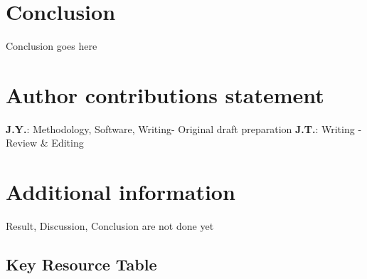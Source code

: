\documentclass[fleqn,10pt]{wlscirep}
\begin{document}


\section*{Conclusion}
\label{conc}
Conclusion goes here




\section*{Author contributions statement}
\textbf{J.Y.}: Methodology, Software, Writing- Original draft preparation
\textbf{J.T.}: Writing - Review \& Editing

\section*{Additional information}
Result, Discussion, Conclusion are not done yet


\subsection*{Key Resource Table}

\end{document}
